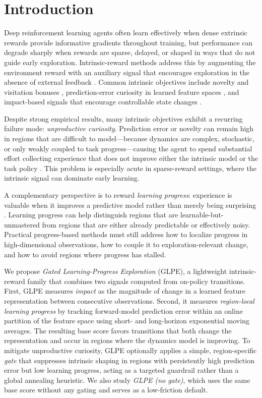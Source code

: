 \section{Introduction}
\label{sec:introduction}

Deep reinforcement learning agents often learn effectively when dense extrinsic rewards provide informative gradients throughout training, but performance can degrade sharply when rewards are sparse, delayed, or shaped in ways that do not guide early exploration.
Intrinsic-reward methods address this by augmenting the environment reward with an auxiliary signal that encourages exploration in the absence of external feedback \cite{singh-2004,barto-2012,oudeyer-2007A,oudeyer-2007B}.
Common intrinsic objectives include novelty and visitation bonuses \cite{bellemare-2016,tang-2016}, prediction-error curiosity in learned feature spaces \cite{pathak-2017,burda-2018A,burda-2018B}, and impact-based signals that encourage controllable state changes \cite{raileanu-2020}.

Despite strong empirical results, many intrinsic objectives exhibit a recurring failure mode: \emph{unproductive curiosity}.
Prediction error or novelty can remain high in regions that are difficult to model---because dynamics are complex, stochastic, or only weakly coupled to task progress---causing the agent to spend substantial effort collecting experience that does not improve either the intrinsic model or the task policy \cite{mavor-parker-2021}.
This problem is especially acute in sparse-reward settings, where the intrinsic signal can dominate early learning.

A complementary perspective is to reward \emph{learning progress}: experience is valuable when it improves a predictive model rather than merely being surprising \cite{schmidhuber-1991,oudeyer-2007A,baranes-2009}.
Learning progress can help distinguish regions that are learnable-but-unmastered from regions that are either already predictable or effectively noisy.
Practical progress-based methods must still address how to localize progress in high-dimensional observations, how to couple it to exploration-relevant change, and how to avoid regions where progress has stalled.

We propose \emph{Gated Learning-Progress Exploration} (GLPE), a lightweight intrinsic-reward family that combines two signals computed from on-policy transitions.
First, GLPE measures \emph{impact} as the magnitude of change in a learned feature representation between consecutive observations.
Second, it measures \emph{region-local learning progress} by tracking forward-model prediction error within an online partition of the feature space using short- and long-horizon exponential moving averages.
The resulting base score favors transitions that both change the representation and occur in regions where the dynamics model is improving.
To mitigate unproductive curiosity, GLPE optionally applies a simple, region-specific \emph{gate} that suppresses intrinsic shaping in regions with persistently high prediction error but low learning progress, acting as a targeted guardrail rather than a global annealing heuristic.
We also study \emph{GLPE (no gate)}, which uses the same base score without any gating and serves as a low-friction default.


